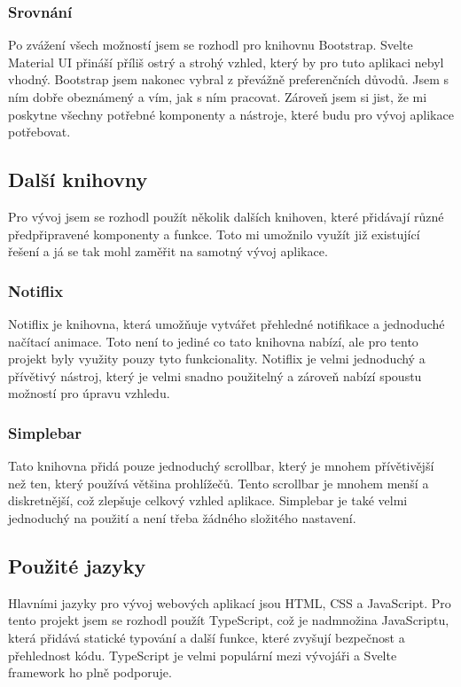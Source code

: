 \subsubsection*{Srovnání}
Po zvážení všech možností jsem se rozhodl pro knihovnu Bootstrap. Svelte Material UI přináší příliš ostrý a strohý vzhled, který by pro tuto aplikaci nebyl vhodný. Bootstrap jsem nakonec vybral z převážně preferenčních důvodů. Jsem s ním dobře obeznámený a vím, jak s ním pracovat. Zároveň jsem si jist, že mi poskytne všechny potřebné komponenty a nástroje, které budu pro vývoj aplikace potřebovat.

\subsection{Další knihovny}
Pro vývoj jsem se rozhodl použít několik dalších knihoven, které přidávají různé předpřipravené komponenty a funkce. Toto mi umožnilo využít již existující řešení a já se tak mohl zaměřit na samotný vývoj aplikace.

\subsubsection*{Notiflix}
Notiflix je knihovna, která umožňuje vytvářet přehledné notifikace a jednoduché načítací animace. Toto není to jediné co tato knihovna nabízí, ale pro tento projekt byly využity pouzy tyto funkcionality. Notiflix je velmi jednoduchý a přívětivý nástroj, který je velmi snadno použitelný a zároveň nabízí spoustu možností pro úpravu vzhledu.\cite{notiflix}

\subsubsection*{Simplebar}
Tato knihovna přidá pouze jednoduchý scrollbar, který je mnohem přívětivější než ten, který používá většina prohlížečů. Tento scrollbar je mnohem menší a diskretnější, což zlepšuje celkový vzhled aplikace. Simplebar je také velmi jednoduchý na použití a není třeba žádného složitého nastavení.\cite{simplebar}

\subsection{Použité jazyky}
Hlavními jazyky pro vývoj webových aplikací jsou HTML, CSS a JavaScript. Pro tento projekt jsem se rozhodl použít TypeScript, což je nadmnožina JavaScriptu, která přidává statické typování a další funkce, které zvyšují bezpečnost a přehlednost kódu. TypeScript je velmi populární mezi vývojáři a Svelte framework ho plně podporuje.